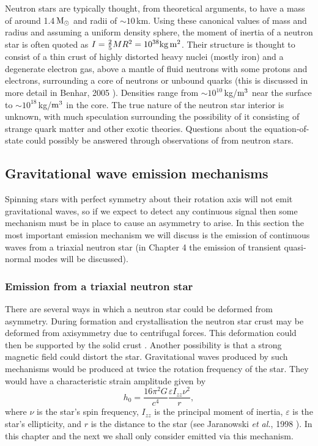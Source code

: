 Neutron stars are typically thought, from theoretical arguments, to have a mass of around
1.4\,${\rm M}_\odot$ and radii of $\sim 10$\,km. Using these canonical values of mass and radius and
assuming a uniform density sphere, the moment of inertia of a neutron star is often quoted as $I =
\frac{2}{5}MR^2 = 10^{38}\rm{kg}\,\rm{m}^2$. Their structure is thought to consist of a thin crust
of highly distorted heavy nuclei (mostly iron) and a degenerate electron gas, above a mantle of
fluid neutrons with some protons and electrons, surrounding a core of neutrons or unbound quarks
(this is discussed in more detail in Benhar, 2005 \cite{Benhar:2005}). Densities range from $\sim
10^{10}$\,kg/${\rm{m}}^3$ near the surface to $\sim 10^{18}$\,kg/${\rm{m}}^3$ in the core. The true
nature of the neutron star interior is unknown, with much speculation surrounding the possibility of
it consisting of strange quark matter and other exotic theories. Questions about the
equation-of-state could possibly be answered through observations of \gws from neutron stars. 

\subsection{Gravitational wave emission mechanisms}
Spinning stars with perfect symmetry about their rotation axis will not emit gravitational waves, so
if we expect to detect any continuous \gw signal then some mechanism must be in place to cause an
asymmetry to arise. In this section the most important \gw emission mechanism we will discuss is the
emission of continuous waves from a triaxial neutron star (in Chapter 4 the emission of transient
quasi-normal modes will be discussed).

\subsubsection{Emission from a triaxial neutron star}
There are several ways in which a neutron star could be deformed from asymmetry. During formation
and crystallisation the neutron star crust may be deformed from axisymmetry due to centrifugal
forces. This deformation could then be supported by the solid crust \cite{Pandharipande:1976}.
Another possibility is that a strong magnetic field could distort the star. Gravitational waves
produced by such mechanisms would be produced at twice the rotation frequency of the star. They
would have a characteristic strain amplitude given by
\begin{equation}\label{Pulsarh0}
h_0 = \frac{16\pi^2G}{c^4}\frac{\varepsilon I_{zz}\nu^2}{r},
\end{equation}
where $\nu$ is the star's spin frequency, $I_{zz}$ is the principal moment of inertia, $\varepsilon$
is the star's ellipticity, and $r$ is the distance to the star (see Jaranowski {\it et al.}, 1998
\cite{JKS:1998}). In this chapter and the next we shall only consider \gws emitted via this
mechanism.

